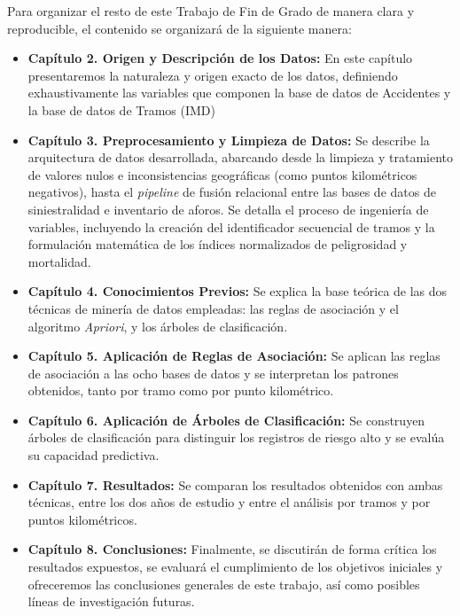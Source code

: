 \documentclass[twoside,a4paper,12pt,onecolumn,openany]{book}
\begin{document}
Para organizar el resto de este Trabajo de Fin de Grado de manera clara y reproducible, el contenido se organizará de la siguiente manera:

\begin{itemize}
    \item \textbf{Capítulo 2. Origen y Descripción de los Datos:} En este capítulo presentaremos la naturaleza y origen exacto de los datos, definiendo exhaustivamente las variables que componen la base de datos de Accidentes y la base de datos de Tramos (IMD)
   
    \item \textbf{Capítulo 3. Preprocesamiento y Limpieza de Datos:} Se describe la arquitectura de datos desarrollada, abarcando desde la limpieza y tratamiento de valores nulos e inconsistencias geográficas (como puntos kilométricos negativos), hasta el \textit{pipeline} de fusión relacional entre las bases de datos de siniestralidad e inventario de aforos. Se detalla el proceso de ingeniería de variables, incluyendo la creación del identificador secuencial de tramos y la formulación matemática de los índices normalizados de peligrosidad y mortalidad.
    
    \item \textbf{Capítulo 4. Conocimientos Previos:} Se explica la base teórica de las dos técnicas de minería de datos empleadas: las reglas de asociación y el algoritmo \textit{Apriori}, y los árboles de clasificación.
    
    \item \textbf{Capítulo 5. Aplicación de Reglas de Asociación:} Se aplican las reglas de asociación a las ocho bases de datos y se interpretan los patrones obtenidos, tanto por tramo como por punto kilométrico.
    
    \item \textbf{Capítulo 6. Aplicación de Árboles de Clasificación:} Se construyen árboles de clasificación para distinguir los registros de riesgo alto y se evalúa su capacidad predictiva.

    \item \textbf{Capítulo 7. Resultados:} Se comparan los resultados obtenidos con ambas técnicas, entre los dos años de estudio y entre el análisis por tramos y por puntos kilométricos.
    
    \item \textbf{Capítulo 8. Conclusiones:} Finalmente, se discutirán de forma crítica los resultados expuestos, se evaluará el cumplimiento de los objetivos iniciales y ofreceremos las conclusiones generales de este trabajo, así como posibles líneas de investigación futuras.
   
\end{itemize}
\end{document}
